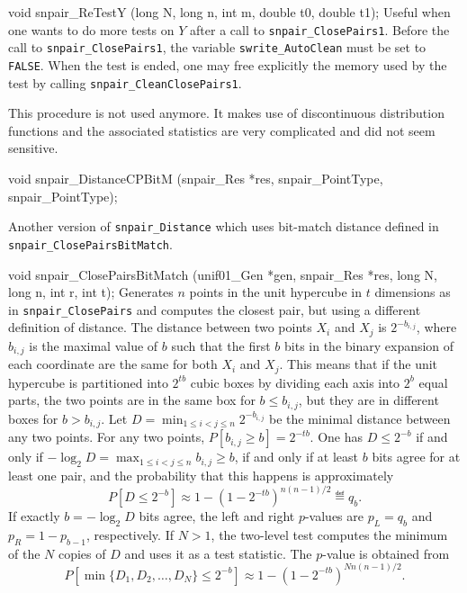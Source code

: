 void snpair_ReTestY (long N, long n, int m, double t0, double t1);
\endcode
 \tab Useful when one wants to do more tests on $Y$ 
   after a call to  {\tt snpair\_ClosePairs1}. Before the call to
   {\tt snpair\_ClosePairs1}, the variable {\tt swrite\_AutoClean} must be
   set to {\tt FALSE}. When the test is ended, one may free explicitly
  the memory used by the test by calling {\tt snpair\_CleanClosePairs1}.

  This procedure is not used anymore. It makes use of discontinuous
  distribution functions and the associated statistics are very
  complicated and did not seem sensitive.
 \endtab
\endhide  %
\ifdetailed  %


\code

void snpair_DistanceCPBitM (snpair_Res *res, snpair_PointType,
                            snpair_PointType);

\endcode
 \tab Another version of {\tt snpair\_Distance} which uses bit-match 
  distance defined in {\tt snpair\_Clo\-se\-Pairs\-Bit\-Match}.
\endtab
\fi %
\code


void snpair_ClosePairsBitMatch (unif01_Gen *gen, snpair_Res *res,
                                long N, long n, int r, int t);
\endcode
 \tab  Generates $n$ points in the unit hypercube in $t$ dimensions
   as in {\tt snpair\_ClosePairs} and computes the closest pair,
   but using a different definition of distance.
   The distance between two points $X_i$ and $X_j$ is $2^{-b_{i,j}}$,
   where $b_{i,j}$ is the maximal value of $b$ such that the first 
   $b$ bits in the binary expansion of each coordinate are the same
   for both $X_i$ and $X_j$.  This means that if the unit hypercube
   is partitioned into $2^{tb}$ cubic boxes by dividing each axis into
   $2^b$ equal parts, the two points are in the same box for 
   $b\le b_{i,j}$, but they are in different boxes for $b > b_{i,j}$.
   Let $D = \min_{1\le i<j\le n} 2^{-b_{i,j}}$ be the minimal distance
   between any two points.
   For any two points, $P[b_{i,j} \ge b] = 2^{-tb}$.
   One has  $D\le 2^{-b}$ if and only if
   $-\log_2 D = \max_{1\le i<j\le n} b_{i,j} \ge b$, if and only if
   at least $b$ bits agree for at least one pair, and the probability 
   that this happens is approximately
    $$ P[D\le 2^{-b}] \approx 1 - \left(1 - 2^{-tb}\right)^{n(n-1)/2}
        \eqdef q_b. $$
   If exactly $b = -\log_2 D$ bits agree, the left and right $p$-values
   are $p_L = q_b$ and $p_R = 1 - p_{b-1}$, respectively.
   If $N>1$, the two-level test computes the minimum of the $N$ copies
   of $D$ and uses it as a test statistic. The $p$-value is obtained from
   $$
   P[\min\{D_1, D_2, \ldots, D_N\} \le 2^{-b}]
     \approx 1 - \left(1 - 2^{-tb}\right)^{Nn(n-1)/2}.
   $$
 \endtab

